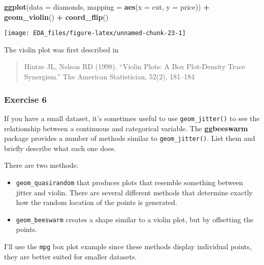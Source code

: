 \documentclass[]{book}
\newenvironment{Shaded}{\begin{snugshade}}{\end{snugshade}}
\newcommand{\DataTypeTok}[1]{\textcolor[rgb]{0.13,0.29,0.53}{#1}}
\newcommand{\KeywordTok}[1]{\textcolor[rgb]{0.13,0.29,0.53}{\textbf{#1}}}
\newcommand{\NormalTok}[1]{#1}
\newcommand{\OperatorTok}[1]{\textcolor[rgb]{0.81,0.36,0.00}{\textbf{#1}}}
\newcommand{\StringTok}[1]{\textcolor[rgb]{0.31,0.60,0.02}{#1}}
\providecommand{\tightlist}{%
  \setlength{\itemsep}{0pt}\setlength{\parskip}{0pt}}
\theoremstyle{definition}
\theoremstyle{definition}
\theoremstyle{definition}
\theoremstyle{remark}
\begin{document}
\begin{Shaded}
\begin{Highlighting}[]
\KeywordTok{ggplot}\NormalTok{(}\DataTypeTok{data =}\NormalTok{ diamonds, }\DataTypeTok{mapping =} \KeywordTok{aes}\NormalTok{(}\DataTypeTok{x =}\NormalTok{ cut, }\DataTypeTok{y =}\NormalTok{ price)) }\OperatorTok{+}
\StringTok{  }\KeywordTok{geom_violin}\NormalTok{() }\OperatorTok{+}
\StringTok{  }\KeywordTok{coord_flip}\NormalTok{()}
\end{Highlighting}
\end{Shaded}

\begin{center}\texttt{[image: EDA\_files/figure-latex/unnamed-chunk-23-1]} \end{center}

The violin plot was first described in

\begin{quote}
Hintze JL, Nelson RD (1998). ``Violin Plots: A Box Plot-Density Trace
Synergism.'' The American Statistician, 52(2), 181--184
\end{quote}

\hypertarget{exercise-6-3}{%
\subsubsection{Exercise 6}\label{exercise-6-3}}

If you have a small dataset, it's sometimes useful to use
\texttt{geom\_jitter()} to see the relationship between a continuous and
categorical variable. The \textbf{ggbeeswarm} package provides a number
of methods similar to \texttt{geom\_jitter()}. List them and briefly
describe what each one does.

There are two methods:

\begin{itemize}
\tightlist
\item
  \texttt{geom\_quasirandom} that produces plots that resemble something
  between jitter and violin. There are several different methods that
  determine exactly how the random location of the points is generated.
\item
  \texttt{geom\_beeswarm} creates a shape similar to a violin plot, but
  by offsetting the points.
\end{itemize}

I'll use the \texttt{mpg} box plot example since these methods display
individual points, they are better suited for smaller datasets.
\end{document}
